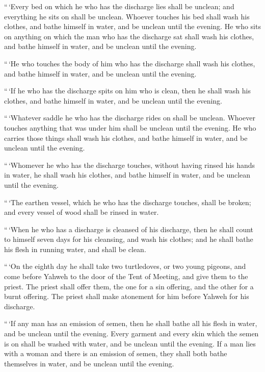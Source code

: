 ``\,`Every bed on which he who has the discharge lies shall
be unclean; and everything he sits on shall be unclean. 
Whoever touches his bed shall wash his clothes, and bathe himself in
water, and be unclean until the evening.  He who sits on
anything on which the man who has the discharge sat shall wash his
clothes, and bathe himself in water, and be unclean until the evening.

 ``\,`He who touches the body of him who has the discharge
shall wash his clothes, and bathe himself in water, and be unclean until
the evening.

 ``\,`If he who has the discharge spits on him who is clean,
then he shall wash his clothes, and bathe himself in water, and be
unclean until the evening.

 ``\,`Whatever saddle he who has the discharge rides on
shall be unclean.  Whoever touches anything that was under
him shall be unclean until the evening. He who carries those things
shall wash his clothes, and bathe himself in water, and be unclean until
the evening.

 ``\,`Whomever he who has the discharge touches, without
having rinsed his hands in water, he shall wash his clothes, and bathe
himself in water, and be unclean until the evening.

 ``\,`The earthen vessel, which he who has the discharge
touches, shall be broken; and every vessel of wood shall be rinsed in
water.

 ``\,`When he who has a discharge is cleansed of his
discharge, then he shall count to himself seven days for his cleansing,
and wash his clothes; and he shall bathe his flesh in running water, and
shall be clean.

 ``\,`On the eighth day he shall take two turtledoves, or
two young pigeons, and come before Yahweh to the door of the Tent of
Meeting, and give them to the priest.  The priest shall
offer them, the one for a sin offering, and the other for a burnt
offering. The priest shall make atonement for him before Yahweh for his
discharge.

 ``\,`If any man has an emission of semen, then he shall
bathe all his flesh in water, and be unclean until the evening.
 Every garment and every skin which the semen is on shall
be washed with water, and be unclean until the evening.  If
a man lies with a woman and there is an emission of semen, they shall
both bathe themselves in water, and be unclean until the evening.

